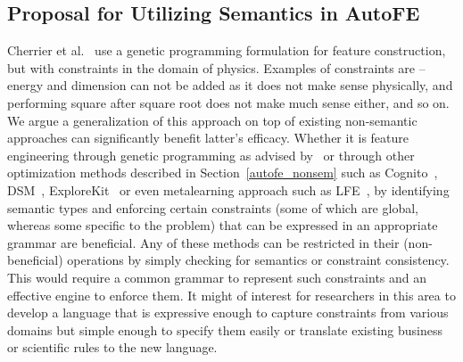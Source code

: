 \documentclass[sigconf, nonacm]{acmart}
\begin{document}
\subsection{Proposal for Utilizing Semantics in AutoFE}
Cherrier et al.~\cite{cherrier2019consistent} use a genetic programming formulation for feature construction, but with constraints in the domain of physics. Examples of constraints are -- energy and dimension can not be added as it does not make sense physically, and performing square after square root does not make much sense either, and so on. We argue a generalization of this approach on top of existing non-semantic approaches can significantly benefit latter's efficacy. Whether it is feature engineering through genetic programming as advised by~\cite{cherrier2019consistent} or through other optimization methods described in Section~\ref{autofe_nonsem} such as Cognito~\cite{khurana2018feature}, DSM~\cite{kanter:dsm}, ExploreKit~\cite{DBLP:conf/icdm/KatzSS16} or even metalearning approach such as LFE~\cite{lfe}, by identifying semantic types and enforcing certain constraints (some of which are global, whereas some specific to the problem) that can be expressed in an appropriate grammar are beneficial. Any of these methods can be restricted in their (non-beneficial) operations by simply checking for semantics or constraint consistency. 
This would require a common grammar to represent such constraints and an effective engine to enforce them. It might of interest for researchers in this area to develop a language that is expressive enough to capture constraints from various domains but simple enough to specify them easily or translate existing business or scientific rules to the new language.
\end{document}
